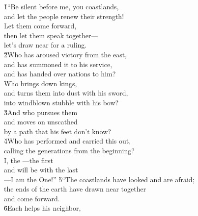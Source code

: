 \begin{poetry}
\poeml {}
\v{1}``Be silent before me, you coastlands, \\
\poemll    and let the people renew their strength! \\
\poeml Let them come forward, \\
\poemll    then let them speak together--- \\
\poemlll       let's draw near for a ruling. \\
\poeml \v{2}Who has aroused victory from the east, \\
\poemll    and has summoned it to his service, \\
\poemlll       and has handed over nations to him? \\
\poeml Who brings down kings, \\
\poemll    and turns them into dust with his sword, \\
\poemlll       into windblown stubble with his bow? \\
\poeml \v{3}And who pursues them \\
\poemll    and moves on unscathed \\
\poemlll       by a path that his feet don't know? \\
\poeml \v{4}Who has performed and carried this out, \\
\poemll    calling the generations from the beginning? \\
\poeml I, the ---the first \\
\poemll    and will be with the last \\
\poemlll       ---I am the One!''
\poeml \v{5}``The coastlands have looked and are afraid; \\
\poemll    the ends of the earth have drawn near together \\
\poemlll       and come forward. \\
\poeml \v{6}Each helps his neighbor, \\

\end{poetry}
